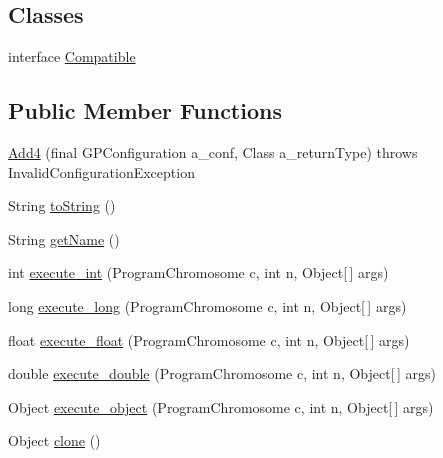 \subsection*{Classes}
\begin{DoxyCompactItemize}
\item 
interface \hyperlink{interfaceorg_1_1jgap_1_1gp_1_1function_1_1_add4_1_1_compatible}{Compatible}
\end{DoxyCompactItemize}
\subsection*{Public Member Functions}
\begin{DoxyCompactItemize}
\item 
\hyperlink{classorg_1_1jgap_1_1gp_1_1function_1_1_add4_a61b95355dfa710c94e592447b7042e75}{Add4} (final G\-P\-Configuration a\-\_\-conf, Class a\-\_\-return\-Type)  throws Invalid\-Configuration\-Exception 
\item 
String \hyperlink{classorg_1_1jgap_1_1gp_1_1function_1_1_add4_a8375b62dc5e6c03a5cc5d86a2be3e1cc}{to\-String} ()
\item 
String \hyperlink{classorg_1_1jgap_1_1gp_1_1function_1_1_add4_afe18c5fd8a2309a0dd3f07d2044c5849}{get\-Name} ()
\item 
int \hyperlink{classorg_1_1jgap_1_1gp_1_1function_1_1_add4_a1036e2a41e834daac87c8caaca7363bf}{execute\-\_\-int} (Program\-Chromosome c, int n, Object\mbox{[}$\,$\mbox{]} args)
\item 
long \hyperlink{classorg_1_1jgap_1_1gp_1_1function_1_1_add4_a20d03531be63935ac1c5fea9ba9ad6d2}{execute\-\_\-long} (Program\-Chromosome c, int n, Object\mbox{[}$\,$\mbox{]} args)
\item 
float \hyperlink{classorg_1_1jgap_1_1gp_1_1function_1_1_add4_af2c73c70cf4a31af8a4a06f4f6c61901}{execute\-\_\-float} (Program\-Chromosome c, int n, Object\mbox{[}$\,$\mbox{]} args)
\item 
double \hyperlink{classorg_1_1jgap_1_1gp_1_1function_1_1_add4_a9f03e277886f52d9f5b9e8caab264c10}{execute\-\_\-double} (Program\-Chromosome c, int n, Object\mbox{[}$\,$\mbox{]} args)
\item 
Object \hyperlink{classorg_1_1jgap_1_1gp_1_1function_1_1_add4_aa7793ad6dff9cfc17b8ef9040554acc7}{execute\-\_\-object} (Program\-Chromosome c, int n, Object\mbox{[}$\,$\mbox{]} args)
\item 
Object \hyperlink{classorg_1_1jgap_1_1gp_1_1function_1_1_add4_ae56c84c38dc3164ce0a74e5b45f7bd25}{clone} ()
\end{DoxyCompactItemize}
